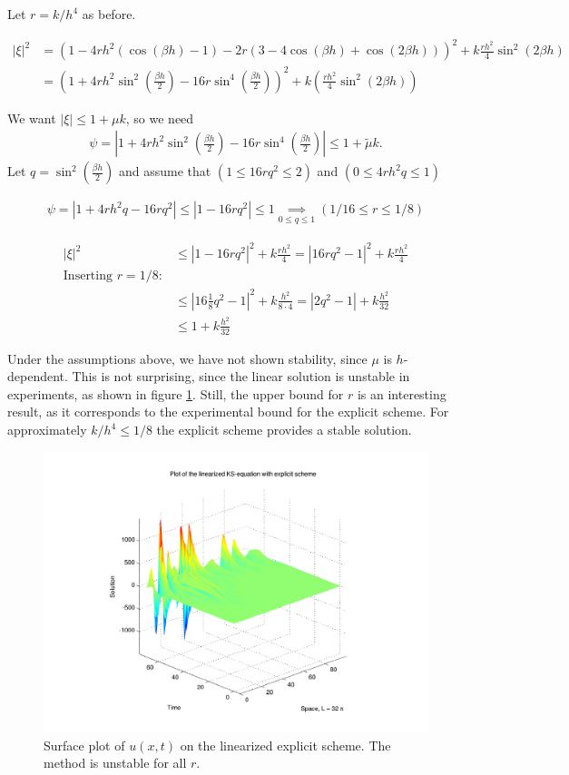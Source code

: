 Let $r = k/h^4$ as before.

\begin{align*}
|\xi |^2 &= (1-4rh^2(\cos(\beta h)-1)-2r(3-4\cos(\beta h)+\cos(2\beta h)))^2 + k\frac{rh^2}{4}\sin^2(2\beta h) \\
&= \left(1+4rh^2\sin^2\left(\frac{\beta h}{2}\right)-16r\sin^4\left(\frac{\beta h}{2}\right)\right)^2 + k\left(\frac{rh^2}{4}\sin^2(2\beta h)\right)
\end{align*}

We want $|\xi| \le 1+ \mu k$, so we need 
\begin{align*}
\psi = |1+4rh^2\sin^2\left(\frac{\beta h}{2}\right)-16r\sin^4\left(\frac{\beta h}{2}\right)| \le 1 + \tilde{\mu}k.
\end{align*}
Let $q = \sin^2\left(\frac{\beta h}{2}\right)$ and assume that $(1 \le 16rq^2 \le 2)$ and $(0 \le 4rh^2q \le 1)$


\begin{align*}
\psi = \left| 1+4rh^2q -16rq^2\right| \le \left| 1-16rq^2\right| \le 1 \underset{0\le q\le 1}{\implies} \left(1/16 \le r \le 1/8 \right)
\end{align*} 

\begin{align*}
|\xi |^2 &\le |1-16rq^2|^2 + k\frac{rh^2}{4} = |16rq^2-1|^2  + k\frac{rh^2}{4} \\
\textrm{Inserting } r = 1/8: \\
&\le |16\frac{1}{8}q^2-1|^2 + k\frac{h^2}{8\cdot 4} = |2q^2-1| + k\frac{h^2}{32} \\
&\le 1 + k\frac{h^2}{32}
\end{align*}

Under the assumptions above, we have not shown stability, since $\mu$ is $h$-dependent. This is not surprising, since the linear solution is unstable in experiments, as shown in figure \ref{fig:lin_exp}. Still, the upper bound for $r$ is an interesting result, as it corresponds to the experimental bound for the explicit scheme. For approximately $k/h^4 \le 1/8$ the explicit scheme provides a stable solution. 




\begin{figure}[H]
\centering
\includegraphics[scale=0.5]
{../PDFs/FE_Exp/linear_explicit.pdf}
\caption{Surface plot of $u(x,t)$ on the linearized explicit scheme. The method is unstable for all $r$.}
\label{fig:lin_exp}
\end{figure}







